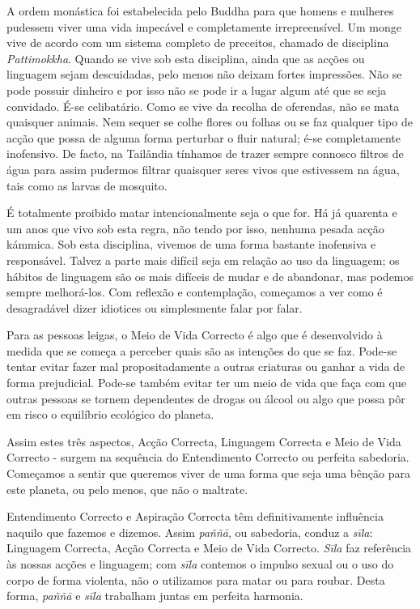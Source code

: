 A ordem monástica foi estabelecida pelo Buddha para que homens e mulheres
pudessem viver uma vida impecável e completamente irrepreensível. Um monge vive
de acordo com um sistema completo de preceitos, chamado de disciplina
\emph{Pattimokkha}. Quando se vive sob esta disciplina, ainda que as acções ou
linguagem sejam descuidadas, pelo menos não deixam fortes impressões. Não se
pode possuir dinheiro e por isso não se pode ir a lugar algum até que se seja
convidado. É-se celibatário. Como se vive da recolha de oferendas, não se mata
quaisquer animais. Nem sequer se colhe flores ou folhas ou se faz qualquer tipo
de acção que possa de alguma forma perturbar o fluir natural; é-se completamente
inofensivo. De facto, na Tailândia tínhamos de trazer sempre connosco filtros de
água para assim pudermos filtrar quaisquer seres vivos que estivessem na água,
tais como as larvas de mosquito.

É totalmente proibido matar intencionalmente seja o que for. Há já quarenta e um
anos que vivo sob esta regra, não tendo por isso, nenhuma pesada acção kámmica.
Sob esta disciplina, vivemos de uma forma bastante inofensiva e responsável.
Talvez a parte mais difícil seja em relação ao uso da linguagem; os hábitos de
linguagem são os mais difíceis de mudar e de abandonar, mas podemos sempre
melhorá-los. Com reflexão e contemplação, começamos a ver como é desagradável
dizer idiotices ou simplesmente falar por falar.

Para as pessoas leigas, o Meio de Vida Correcto é algo que é desenvolvido à
medida que se começa a perceber quais são as intenções do que se faz. Pode-se
tentar evitar fazer mal propositadamente a outras criaturas ou ganhar a vida de
forma prejudicial. Pode-se também evitar ter um meio de vida que faça com que
outras pessoas se tornem dependentes de drogas ou álcool ou algo que possa pôr
em risco o equilíbrio ecológico do planeta.

Assim estes três aspectos, Acção Correcta, Linguagem Correcta e Meio de Vida
Correcto - surgem na sequência do Entendimento Correcto ou perfeita sabedoria.
Começamos a sentir que queremos viver de uma forma que seja uma bênção para este
planeta, ou pelo menos, que não o maltrate.

Entendimento Correcto e Aspiração Correcta têm definitivamente influência
naquilo que fazemos e dizemos. Assim \emph{paññā}, ou sabedoria, conduz a
\emph{sīla}: Linguagem Correcta, Acção Correcta e Meio de Vida Correcto.
\emph{Sīla} faz referência às nossas acções e linguagem; com \emph{sīla}
contemos o impulso sexual ou o uso do corpo de forma violenta, não o utilizamos
para matar ou para roubar. Desta forma, \emph{paññā} e \emph{sīla} trabalham
juntas em perfeita harmonia.


